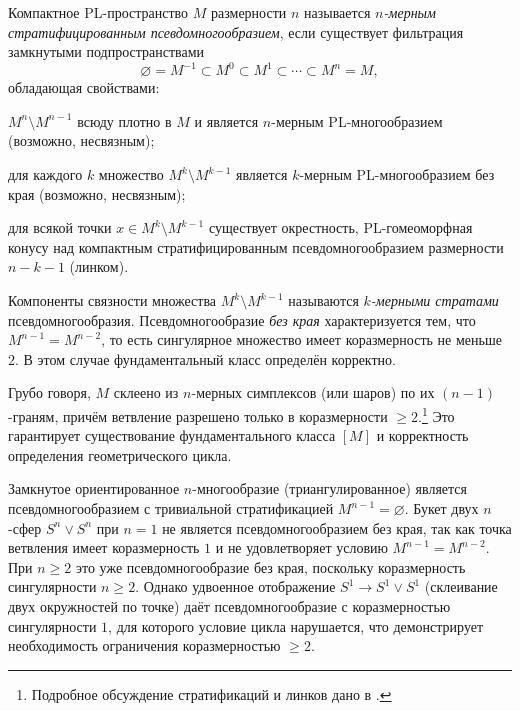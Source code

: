\documentclass[12pt, twoside]{article}
\begin{document}
\begin{definition}\label{def:psmv}
Компактное PL-пространство $M$ размерности $n$ называется \emph{$n$-мерным стратифицированным псевдомногообразием}, если существует фильтрация замкнутыми подпространствами
\begin{equation}
    \varnothing = M^{-1} \subset M^0 \subset M^1 \subset \cdots \subset M^n = M,
\end{equation}
обладающая свойствами:
\begin{conditions}
\item $M^n \setminus M^{n-1}$ всюду плотно в $M$ и является $n$-мерным PL-многообразием (возможно, несвязным);
\item для каждого $k$ множество $M^k \setminus M^{k-1}$ является $k$-мерным PL-многообразием без края (возможно, несвязным);
\item для всякой точки $x \in M^k \setminus M^{k-1}$ существует окрестность, PL-гомеоморфная конусу над компактным стратифицированным псевдомногообразием размерности $n-k-1$ (линком).
\end{conditions}
Компоненты связности множества $M^k \setminus M^{k-1}$ называются \emph{$k$-мерными стратами} псевдомногообразия.
Псевдомногообразие \emph{без края} характеризуется тем, что $M^{n-1} = M^{n-2}$, то есть сингулярное множество имеет коразмерность не меньше $2$. В этом случае фундаментальный класс определён корректно.
\end{definition}

Грубо говоря, $M$ склеено из $n$-мерных симплексов (или шаров) по их $(n-1)$-граням, причём ветвление разрешено только в коразмерности $\ge 2$.\footnote{Подробное обсуждение стратификаций и линков дано в \cite[Гл.~I, §1]{BRS}.} Это гарантирует существование фундаментального класса $[M]$ и корректность определения геометрического цикла.

\begin{example}
Замкнутое ориентированное $n$-многообразие (триангулированное) является псевдомногообразием с тривиальной стратификацией $M^{n-1}=\varnothing$. Букет двух $n$-сфер $S^n \vee S^n$ при $n=1$ не является псевдомногообразием без края, так как точка ветвления имеет коразмерность $1$ и не удовлетворяет условию $M^{n-1}=M^{n-2}$. При $n\ge 2$ это уже псевдомногообразие без края, поскольку коразмерность сингулярности $n\ge 2$. Однако удвоенное отображение $S^1\to S^1\vee S^1$ (склеивание двух окружностей по точке) даёт псевдомногообразие с коразмерностью сингулярности $1$, для которого условие цикла нарушается, что демонстрирует необходимость ограничения коразмерностью $\ge 2$.
\end{example}
\end{document}
